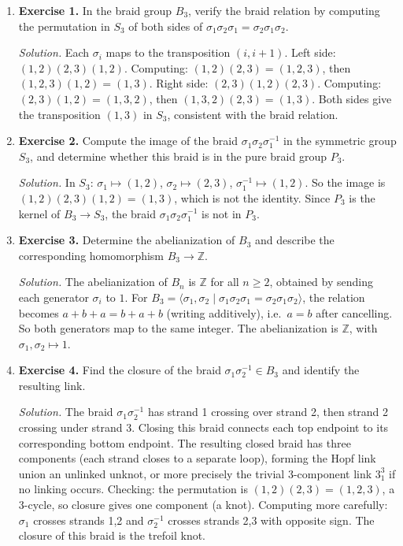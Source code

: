 \begin{enumerate}[leftmargin=*,itemsep=0.9em]

\item \textbf{Exercise 1.} In the braid group $B_3$, verify the braid relation by computing the permutation in $S_3$ of both sides of $\sigma_1\sigma_2\sigma_1=\sigma_2\sigma_1\sigma_2$.

\emph{Solution.} Each $\sigma_i$ maps to the transposition $(i,i+1)$. Left side: $(1,2)(2,3)(1,2)$. Computing: $(1,2)(2,3)=(1,2,3)$, then $(1,2,3)(1,2)=(1,3)$. Right side: $(2,3)(1,2)(2,3)$. Computing: $(2,3)(1,2)=(1,3,2)$, then $(1,3,2)(2,3)=(1,3)$. Both sides give the transposition $(1,3)$ in $S_3$, consistent with the braid relation.

\item \textbf{Exercise 2.} Compute the image of the braid $\sigma_1\sigma_2\sigma_1^{-1}$ in the symmetric group $S_3$, and determine whether this braid is in the pure braid group $P_3$.

\emph{Solution.} In $S_3$: $\sigma_1\mapsto(1,2)$, $\sigma_2\mapsto(2,3)$, $\sigma_1^{-1}\mapsto(1,2)$. So the image is $(1,2)(2,3)(1,2)=(1,3)$, which is not the identity. Since $P_3$ is the kernel of $B_3\to S_3$, the braid $\sigma_1\sigma_2\sigma_1^{-1}$ is not in $P_3$.

\item \textbf{Exercise 3.} Determine the abelianization of $B_3$ and describe the corresponding homomorphism $B_3\to\mathbb{Z}$.

\emph{Solution.} The abelianization of $B_n$ is $\mathbb{Z}$ for all $n\ge 2$, obtained by sending each generator $\sigma_i$ to $1$. For $B_3=\langle\sigma_1,\sigma_2\mid\sigma_1\sigma_2\sigma_1=\sigma_2\sigma_1\sigma_2\rangle$, the relation becomes $a+b+a=b+a+b$ (writing additively), i.e.\ $a=b$ after cancelling. So both generators map to the same integer. The abelianization is $\mathbb{Z}$, with $\sigma_1,\sigma_2\mapsto 1$.

\item \textbf{Exercise 4.} Find the closure of the braid $\sigma_1\sigma_2^{-1}\in B_3$ and identify the resulting link.

\emph{Solution.} The braid $\sigma_1\sigma_2^{-1}$ has strand 1 crossing over strand 2, then strand 2 crossing under strand 3. Closing this braid connects each top endpoint to its corresponding bottom endpoint. The resulting closed braid has three components (each strand closes to a separate loop), forming the Hopf link union an unlinked unknot, or more precisely the trivial 3-component link $3_1^3$ if no linking occurs. Checking: the permutation is $(1,2)(2,3)=(1,2,3)$, a 3-cycle, so closure gives one component (a knot). Computing more carefully: $\sigma_1$ crosses strands 1,2 and $\sigma_2^{-1}$ crosses strands 2,3 with opposite sign. The closure of this braid is the trefoil knot.


\end{enumerate}
